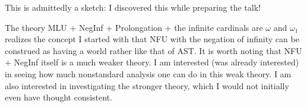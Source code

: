 \documentclass{slides}
\begin{document}
\begin{slide}

This is admittedly a sketch:  I discovered this while preparing the talk!  

The theory MLU + NegInf + Prolongation + the infinite cardinals are $\omega$ and $\omega_1$  realizes the concept I started with that NFU with the negation of infinity can be construed as having a world rather like that of AST.   It is worth noting that NFU + NegInf itself is a much weaker theory.  I am interested (was already interested) in seeing how much nonstandard analysis one can do in this weak theory.  I am also interested in investigating the stronger theory, which I would not initially even have thought consistent.

\end{slide}
\end{document}
